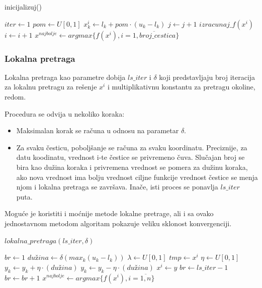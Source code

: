 \documentclass[a4paper]{article}
\begin{document}
\begin{algorithm}[H]
\caption{inicijalizuj()}
\begin{algorithmic}[1]
\label{alg:inicjializuj}
\STATE $iter \leftarrow 1$
\STATE $pom \leftarrow \textit{U}[0, 1]$
\STATE $x_{k}^i \leftarrow l_{k} + pom \cdot (u_{k} - l_{k})$
\STATE $j \leftarrow j + 1$
\ENDWHILE
\STATE $izracunaj\_f(x^i)$
\STATE $i \leftarrow i + 1$
\ENDWHILE
\STATE $x^{najbolje} \leftarrow argmax\{f(x^i), i=\overline{1,broj\_cestica}\}$
\end{algorithmic}
\end{algorithm}

\subsubsection{Lokalna pretraga}
\label{subsec:lokalna_pretraga}
Lokalna pretraga kao parametre dobija $ls\_iter$ i $\delta$ koji predstavljaju broj iteracija za lokalnu pretragu za rešenje $x^i$ i multiplikativnu konstantu za pretragu okoline, redom.

Procedura se odvija u nekoliko koraka:
\begin{itemize}
    \item Maksimalan korak se računa u odnosu na parametar $\delta$.
    \item Za svaku česticu, poboljšanje se računa za svaku koordinatu. Preciznije, za datu koodinatu, vrednost i-te čestice se privremeno čuva. Slučajan broj se bira kao dužina koraka i privremena vrednost se pomera za dužinu koraka, ako nova vrednost ima bolju vrednost ciljne funkcije vrednost čestice se menja njom i lokalna pretraga se završava. Inače, isti proces se ponavlja $ls\_iter$ puta.
\end{itemize}
Moguće je koristiti i moćnije metode lokalne pretrage, ali i sa ovako jednostavnom metodom algoritam pokazuje veliku sklonost konvergenciji.

\begin{algorithm}[H]
\label{alg:lokalna_pretraga}
\caption{$lokalna\_pretraga(ls\_iter, \delta)$}
\begin{algorithmic}[1]
\STATE $br \leftarrow 1$
\STATE $dužina \leftarrow \delta(max_{k}(u_{k} - l_{k}))$
\STATE $\lambda \leftarrow \textit{U}[0, 1]$
\STATE $tmp \leftarrow x^i$
\STATE $\eta \leftarrow \textit{U}[0, 1]$
\STATE $y_k \leftarrow y_k + \eta \cdot (dužina)$
\ELSE
\STATE $y_k \leftarrow y_k - \eta \cdot (dužina)$
\ENDIF
{}
\STATE $x^i \leftarrow y$
\STATE $br \leftarrow ls\_iter - 1$
\ENDIF
\STATE $br \leftarrow br + 1$
\ENDWHILE
\ENDFOR
\ENDFOR
\STATE $x^{najbolje} \leftarrow argmax\{f(x^i), i = \overline{1, n}\}$

\end{algorithmic}
\end{algorithm}
\end{document}
